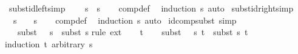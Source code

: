 \begin{isabellebody}
\isamarkupfalse%
\ subst{\isacharunderscore}{\kern0pt}id{\isacharunderscore}{\kern0pt}left{\isacharbrackleft}{\kern0pt}simp{\isacharbrackright}{\kern0pt}{\isacharcolon}{\kern0pt}\isanewline
\ \ {\isachardoublequoteopen}{\isacharbrackleft}{\kern0pt}{\isacharbrackright}{\kern0pt}\ {\isasymbullet}\ s\ {\isacharequal}{\kern0pt}\ s{\isachardoublequoteclose}\isanewline
%
\isadelimproof
\ \ %
\endisadelimproof
%
\isatagproof
{}\isamarkupfalse%
\ comp{\isacharunderscore}{\kern0pt}def\ \isamarkupfalse%
\ {\isacharparenleft}{\kern0pt}induction\ s{\isacharcomma}{\kern0pt}\ auto{\isacharparenright}{\kern0pt}%
\endisatagproof
{\isafoldproof}%
%
\isadelimproof
\isanewline
%
\endisadelimproof
\isanewline
{}\isamarkupfalse%
\ subst{\isacharunderscore}{\kern0pt}id{\isacharunderscore}{\kern0pt}right{\isacharbrackleft}{\kern0pt}simp{\isacharbrackright}{\kern0pt}{\isacharcolon}{\kern0pt}\isanewline
\ \ {\isachardoublequoteopen}s\ {\isasymbullet}\ {\isacharbrackleft}{\kern0pt}{\isacharbrackright}{\kern0pt}\ {\isacharequal}{\kern0pt}\ s{\isachardoublequoteclose}\isanewline
%
\isadelimproof
\ \ %
\endisadelimproof
%
\isatagproof
{}\isamarkupfalse%
\ comp{\isacharunderscore}{\kern0pt}def\ \isamarkupfalse%
\ {\isacharparenleft}{\kern0pt}induction\ s{\isacharcomma}{\kern0pt}\ auto{\isacharparenright}{\kern0pt}%
\endisatagproof
{\isafoldproof}%
%
\isadelimproof
\isanewline
%
\endisadelimproof
\isanewline
{}\isamarkupfalse%
\ id{\isacharunderscore}{\kern0pt}comp{\isacharunderscore}{\kern0pt}subst\ {\isacharbrackleft}{\kern0pt}simp{\isacharbrackright}{\kern0pt}{\isacharcolon}{\kern0pt}\ \isanewline
\ \ \ {\isachardoublequoteopen}subst\ {\isacharparenleft}{\kern0pt}{\isacharbrackleft}{\kern0pt}{\isacharbrackright}{\kern0pt}\ {\isasymbullet}\ s{\isacharparenright}{\kern0pt}\ {\isacharequal}{\kern0pt}\ subst\ s{\isachardoublequoteclose}\isanewline
%
\isadelimproof
%
\endisadelimproof
%
\isatagproof
{}\isamarkupfalse%
{\isacharparenleft}{\kern0pt}rule\ ext{\isacharparenright}{\kern0pt}\isanewline
\ \ \isamarkupfalse%
\ t\isanewline
\ \ \isamarkupfalse%
\ {\isachardoublequoteopen}subst\ {\isacharparenleft}{\kern0pt}{\isacharbrackleft}{\kern0pt}{\isacharbrackright}{\kern0pt}\ {\isasymbullet}\ s{\isacharparenright}{\kern0pt}\ t\ {\isacharequal}{\kern0pt}\ subst\ s\ t{\isachardoublequoteclose}\isanewline
\ \ \isamarkupfalse%
{\isacharparenleft}{\kern0pt}induction\ t\ arbitrary{\isacharcolon}{\kern0pt}\ s{\isacharparenright}{\kern0pt}\isanewline

\end{isabellebody}
